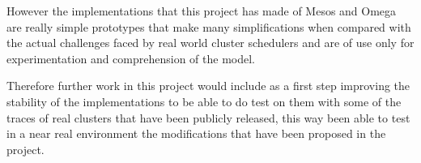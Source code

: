 \documentclass{svjour3}                     %
\begin{document}
However the implementations that this project has made of Mesos and
Omega are really simple prototypes that make many simplifications when
compared with the actual challenges faced by real world cluster
schedulers and are of use only for experimentation and comprehension
of the model. 

Therefore further work in this project would include as a first step
improving the stability of the implementations to be able to do test
on them with some of the traces of real clusters that have been
publicly released, this way been able to test in a near real
environment the modifications that have been proposed in the project.







\end{document}

